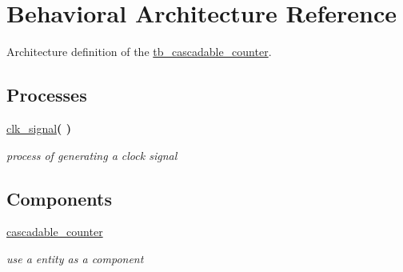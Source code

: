 \hypertarget{classtb__cascadable__counter_1_1_behavioral}{}\section{Behavioral Architecture Reference}
\label{classtb__cascadable__counter_1_1_behavioral}


Architecture definition of the \hyperlink{classtb__cascadable__counter}{tb\+\_\+cascadable\+\_\+counter}.  


\subsection*{Processes}
 \begin{DoxyCompactItemize}
\item 
\hyperlink{classtb__cascadable__counter_1_1_behavioral_a99f3164d142507cc4972fec85ccfe73a}{clk\+\_\+signal}{\bfseries  (  )}\hypertarget{classtb__cascadable__counter_1_1_behavioral_a99f3164d142507cc4972fec85ccfe73a}{}\label{classtb__cascadable__counter_1_1_behavioral_a99f3164d142507cc4972fec85ccfe73a}

\begin{DoxyCompactList}\small\item\em process of generating a clock signal \end{DoxyCompactList}\end{DoxyCompactItemize}
\subsection*{Components}
 \begin{DoxyCompactItemize}
\item 
\hyperlink{classtb__cascadable__counter_1_1_behavioral_a43b32943cff2ea9c75d864730f7a4f8e}{cascadable\+\_\+counter}  {\bfseries }  \hypertarget{classtb__cascadable__counter_1_1_behavioral_a43b32943cff2ea9c75d864730f7a4f8e}{}\label{classtb__cascadable__counter_1_1_behavioral_a43b32943cff2ea9c75d864730f7a4f8e}

\begin{DoxyCompactList}\small\item\em use a entity as a component \end{DoxyCompactList}\end{DoxyCompactItemize}
